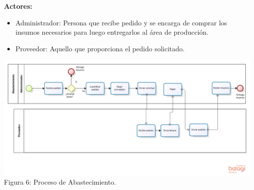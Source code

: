 \begin{itemize}
\textbf{Actores:} 
\begin{itemize}
\item Administrador: Persona que recibe pedido y se encarga de comprar los insumos necesarios para luego entregarlos al área de producción.
\item Proveedor: Aquello que proporciona el pedido solicitado.
\end{itemize}

\begin{center}
\includegraphics[width=15cm]{./imagenes/Abastecimiento.png}\\
Figura 6: Proceso de Abastecimiento.
\end{center}

\end{itemize}

